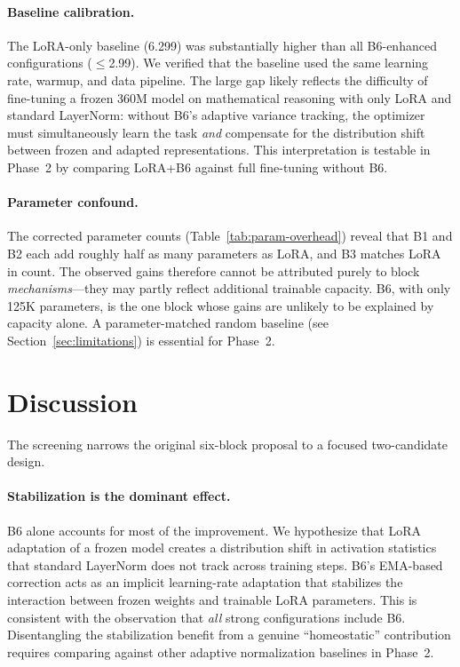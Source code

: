 \documentclass[11pt]{article}
\begin{document}
\paragraph{Baseline calibration.}
The LoRA-only baseline (6.299) was substantially higher than all B6-enhanced
configurations ($\leq$2.99).
We verified that the baseline used the same learning rate, warmup, and data
pipeline.
The large gap likely reflects the difficulty of fine-tuning a frozen 360M model
on mathematical reasoning with only LoRA and standard LayerNorm: without B6's
adaptive variance tracking, the optimizer must simultaneously learn the task
\emph{and} compensate for the distribution shift between frozen and adapted
representations.
This interpretation is testable in Phase~2 by comparing LoRA+B6 against full
fine-tuning without B6.

\paragraph{Parameter confound.}
The corrected parameter counts (Table~\ref{tab:param-overhead}) reveal that B1
and B2 each add roughly half as many parameters as LoRA, and B3 matches LoRA in
count.
The observed gains therefore cannot be attributed purely to block
\emph{mechanisms}---they may partly reflect additional trainable capacity.
B6, with only 125K parameters, is the one block whose gains are unlikely to be
explained by capacity alone.
A parameter-matched random baseline (see Section~\ref{sec:limitations}) is
essential for Phase~2.

\section{Discussion}
\label{sec:discussion}

The screening narrows the original six-block proposal to a focused
two-candidate design.

\paragraph{Stabilization is the dominant effect.}
B6 alone accounts for most of the improvement.
We hypothesize that LoRA adaptation of a frozen model creates a distribution
shift in activation statistics that standard LayerNorm does not track across
training steps.
B6's EMA-based correction acts as an implicit learning-rate adaptation that
stabilizes the interaction between frozen weights and trainable LoRA parameters.
This is consistent with the observation that \emph{all} strong configurations
include B6.
Disentangling the stabilization benefit from a genuine ``homeostatic''
contribution requires comparing against other adaptive normalization baselines
in Phase~2.
\end{document}
